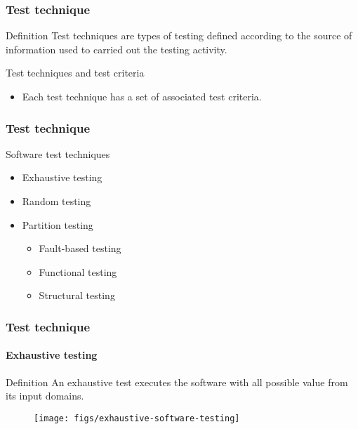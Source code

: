 \begin{frame}[parent={cmap:software-testing-foundations}, hasprev=false, hasnext=true]
\frametitle{Test technique}
\label{concept:test-technique}

\begin{block:concept}{Definition}
Test techniques are types of testing defined according to the
source of information used to carried out the testing activity.
\end{block:concept}

\begin{block:fact}{Test techniques and test criteria}
\begin{itemize}
    \item Each test technique has a set of associated test criteria.
\end{itemize}
\end{block:fact}
\end{frame}



\begin{frame}[hasprev=true, hasnext=true]
\frametitle{Test technique}

\begin{block:fact}{Software test techniques}
\begin{itemize}
	\item Exhaustive testing

	\item Random testing

	\item Partition testing
	\begin{itemize}
		\item Fault-based testing

		\item Functional testing

		\item Structural testing
	\end{itemize}
\end{itemize}
\end{block:fact}
\end{frame}



\begin{frame}
\frametitle{Test technique}
\framesubtitle{Exhaustive testing}
\label{concept:exhaustive-testing}

\begin{block:concept}{Definition}
An exhaustive test executes the software with all possible value from its
input domains.
\end{block:concept}

\begin{figure}
    \centering
    \texttt{[image: figs/exhaustive-software-testing]}
\end{figure}

\hfill
{}
\end{frame}



